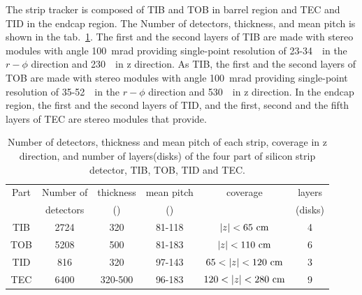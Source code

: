 The strip tracker is composed of TIB and TOB in barrel region
and TEC and TID in the endcap region. The Number of detectors, thickness,
and mean pitch is shown in the tab.~\ref{tab:silicondetectorspec}.
The first and the second layers of TIB are made with stereo modules
with angle 100~mrad providing single-point resolution of 23-34~\um\
in the $r-\phi$ direction and 230~\um\ in z direction. As TIB, the 
first and the second layers of TOB are made with stereo modules
with angle 100~mrad providing single-point resolution of 35-52~\um\
in the $r-\phi$ direction and 530~\um\ in z direction.
In the endcap region, the first and the second layers of TID, and the first, 
second and the fifth layers of TEC are stereo modules that provide. 
%
\begin{table}[htp] 
\begin{center} 
\small
\begin{tabular}{c|ccccc}  
\hline 
Part & Number of & thickness & mean pitch   & coverage & layers     \\ 
     & detectors & (\um)     & (\um)        &          & (disks)    \\ 
\hline \hline 
TIB     & 2724  &   320     &   81-118          & $|z|<65~\mathrm{cm}$      & 4     \\ 
TOB     & 5208  &   500     &   81-183          & $|z|<110~\mathrm{cm}$     & 6     \\ 
TID     &  816  &   320     &   97-143          & $65<|z|<120~\cm$  & 3     \\ 
TEC     & 6400  &   320-500 &   96-183          & $120<|z|<280~\cm$ & 9     \\ 
\hline 
\end{tabular} 
\caption{Number of detectors, thickness and mean pitch of each strip, 
coverage in z direction, and number of layers(disks) of the four part of 
silicon strip detector, TIB, TOB, TID and TEC.} 
\label{tab:silicondetectorspec} 
\end{center} 
\end{table} 


